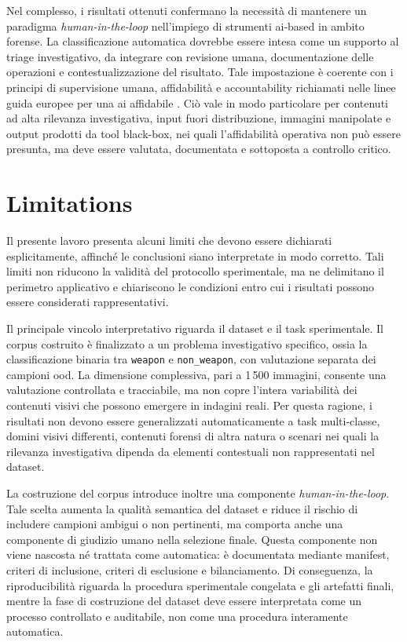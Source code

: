 Nel complesso, i risultati ottenuti confermano la necessità di mantenere un
paradigma \textit{human-in-the-loop} nell'impiego di strumenti \gls{ai}-based in
ambito forense. La classificazione automatica dovrebbe essere intesa come un
supporto al triage investigativo, da integrare con revisione umana,
documentazione delle operazioni e contestualizzazione del risultato. Tale
impostazione è coerente con i principi di supervisione umana, affidabilità e
accountability richiamati nelle linee guida europee per una \gls{ai} affidabile
\cite{EUAI2020}. Ciò vale in modo particolare per contenuti ad alta rilevanza
investigativa, input fuori distribuzione, immagini manipolate e output prodotti
da tool black-box, nei quali l'affidabilità operativa non può essere presunta,
ma deve essere valutata, documentata e sottoposta a controllo critico.



\section{Limitations}
\label{sec:conclusions-limitations}

Il presente lavoro presenta alcuni limiti che devono essere dichiarati
esplicitamente, affinché le conclusioni siano interpretate in modo corretto.
Tali limiti non riducono la validità del protocollo sperimentale, ma ne
delimitano il perimetro applicativo e chiariscono le condizioni entro cui i
risultati possono essere considerati rappresentativi.

Il principale vincolo interpretativo riguarda il dataset e il task sperimentale.
Il corpus costruito è finalizzato a un problema investigativo specifico, ossia
la classificazione binaria tra \texttt{weapon} e \texttt{non\_weapon}, con
valutazione separata dei campioni \gls{ood}. La dimensione complessiva, pari a
1\,500 immagini, consente una valutazione controllata e tracciabile, ma non
copre l'intera variabilità dei contenuti visivi che possono emergere in indagini
reali. Per questa ragione, i risultati non devono essere generalizzati
automaticamente a task multi-classe, domini visivi differenti, contenuti forensi
di altra natura o scenari nei quali la rilevanza investigativa dipenda da
elementi contestuali non rappresentati nel dataset.

La costruzione del corpus introduce inoltre una componente
\textit{human-in-the-loop}. Tale scelta aumenta la qualità semantica del dataset
e riduce il rischio di includere campioni ambigui o non pertinenti, ma comporta
anche una componente di giudizio umano nella selezione finale. Questa componente
non viene nascosta né trattata come automatica: è documentata mediante manifest,
criteri di inclusione, criteri di esclusione e bilanciamento. Di conseguenza, la
riproducibilità riguarda la procedura sperimentale congelata e gli artefatti
finali, mentre la fase di costruzione del dataset deve essere interpretata come
un processo controllato e auditabile, non come una procedura interamente
automatica.


